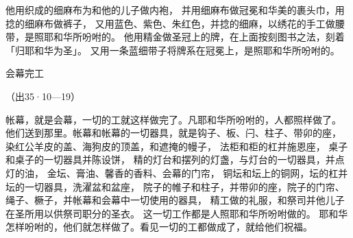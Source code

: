 {\par }{\PP {}他用织成的细麻布为{}和他的儿子做内袍，
并用细麻布做冠冕和华美的裹头巾，用捻的细麻布做裤子，
又用蓝色、紫色、朱红色{}，并捻的细麻，以绣花的手工做腰带，是照耶和华所吩咐{}的。
他用精金做圣冠上的牌，在上面按刻图书之法，刻着「归耶和华为圣」。
又用一条蓝细带子将牌系在冠冕上，是照耶和华所吩咐{}的。
\par }{\SH 会幕完工
\par }{\R （出35·10—19）
\par }{\PP {}帐幕，就是会幕，一切的工就这样做完了。凡耶和华所吩咐{}的，{}人都照样做了。
他们送到{}那里。帐幕和帐幕的一切器具，就是钩子、板、闩、柱子、带卯的座，
染红公羊皮的盖、海狗皮的顶盖，和遮掩{}的幔子，
法柜和柜的杠并施恩座，
桌子和桌子的一切器具并陈设饼，
精{}的灯台和摆列的灯盏，与灯台的一切器具，并点灯的油，
金坛、膏油、馨香的香料、会幕的门帘，
铜坛和坛上的铜网，坛的杠并坛的一切器具，洗濯盆和盆座，
院子的帷子和柱子，并带卯的座，院子的门帘、绳子、橛子，并帐幕和会幕中一切使用的器具，
精工做的礼服，和祭司{}并他儿子在圣所用以供祭司职分的圣衣。
这一切工作都是{}人照耶和华所吩咐{}做的。
耶和华怎样吩咐的，他们就怎样做了。{}看见一切的工都做成了，就给他们祝福。

}

